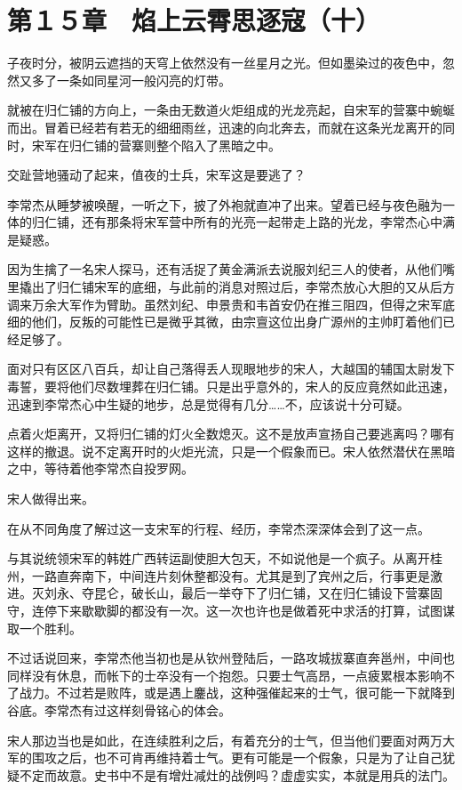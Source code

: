 \section{第１５章　焰上云霄思逐寇（十）}

子夜时分，被阴云遮挡的天穹上依然没有一丝星月之光。但如墨染过的夜色中，忽然又多了一条如同星河一般闪亮的灯带。

就被在归仁铺的方向上，一条由无数道火炬组成的光龙亮起，自宋军的营寨中蜿蜒而出。冒着已经若有若无的细细雨丝，迅速的向北奔去，而就在这条光龙离开的同时，宋军在归仁铺的营寨则整个陷入了黑暗之中。

交趾营地骚动了起来，值夜的士兵，宋军这是要逃了？

李常杰从睡梦被唤醒，一听之下，披了外袍就直冲了出来。望着已经与夜色融为一体的归仁铺，还有那条将宋军营中所有的光亮一起带走上路的光龙，李常杰心中满是疑惑。

因为生擒了一名宋人探马，还有活捉了黄金满派去说服刘纪三人的使者，从他们嘴里撬出了归仁铺宋军的底细，与此前的消息对照过后，李常杰放心大胆的又从后方调来万余大军作为臂助。虽然刘纪、申景贵和韦首安仍在推三阻四，但得之宋军底细的他们，反叛的可能性已是微乎其微，由宗亶这位出身广源州的主帅盯着他们已经足够了。

面对只有区区八百兵，却让自己落得丢人现眼地步的宋人，大越国的辅国太尉发下毒誓，要将他们尽数埋葬在归仁铺。只是出乎意外的，宋人的反应竟然如此迅速，迅速到李常杰心中生疑的地步，总是觉得有几分……不，应该说十分可疑。

点着火炬离开，又将归仁铺的灯火全数熄灭。这不是放声宣扬自己要逃离吗？哪有这样的撤退。说不定离开时的火炬光流，只是一个假象而已。宋人依然潜伏在黑暗之中，等待着他李常杰自投罗网。

宋人做得出来。

在从不同角度了解过这一支宋军的行程、经历，李常杰深深体会到了这一点。

与其说统领宋军的韩姓广西转运副使胆大包天，不如说他是一个疯子。从离开桂州，一路直奔南下，中间连片刻休整都没有。尤其是到了宾州之后，行事更是激进。灭刘永、夺昆仑，破长山，最后一举夺下了归仁铺，又在归仁铺设下营寨固守，连停下来歇歇脚的都没有一次。这一次也许也是做着死中求活的打算，试图谋取一个胜利。

不过话说回来，李常杰他当初也是从钦州登陆后，一路攻城拔寨直奔邕州，中间也同样没有休息，而帐下的士卒没有一个抱怨。只要士气高昂，一点疲累根本影响不了战力。不过若是败阵，或是遇上鏖战，这种强催起来的士气，很可能一下就降到谷底。李常杰有过这样刻骨铭心的体会。

宋人那边当也是如此，在连续胜利之后，有着充分的士气，但当他们要面对两万大军的围攻之后，也不可肯再维持着士气。更有可能是一个假象，只是为了让自己犹疑不定而故意。史书中不是有增灶减灶的战例吗？虚虚实实，本就是用兵的法门。

